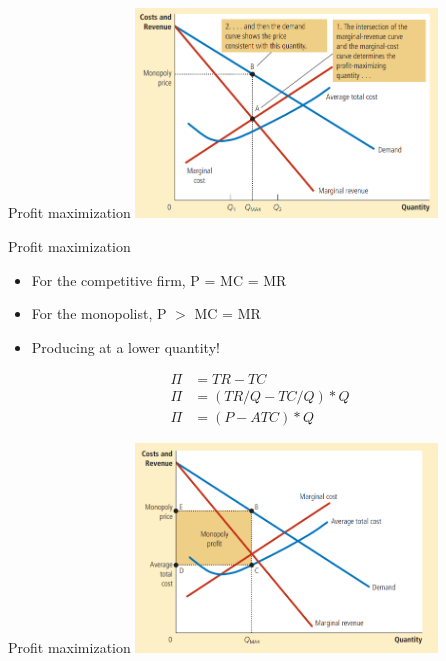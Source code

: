 \documentclass[aspectratio=169]{beamer}
\begin{document}
\begin{frame}{Profit maximization}
    \centering
    \includegraphics[width = 0.6\textwidth,keepaspectratio]{profitmax.png}
\end{frame}

\begin{frame}{Profit maximization}
    \begin{itemize}
        \item For the competitive firm, P = MC = MR
        \item For the monopolist, P $>$ MC = MR
        \item Producing at a lower quantity!
    \end{itemize}

    \begin{equation*}
        \begin{split}
            \Pi & = TR - TC \\
            \Pi & = (TR/Q - TC/Q)*Q \\
            \Pi & = (P - ATC) * Q
        \end{split}
    \end{equation*}
\end{frame}

\begin{frame}{Profit maximization}
    \centering
    \includegraphics[width = 0.6\textwidth,keepaspectratio]{totalprofit.png}
\end{frame}
\end{document}
